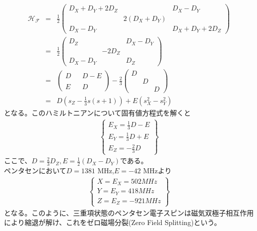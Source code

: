  \begin{eqnarray}
   \mathcal{H_F}&=&\frac{1}{2}
   \left( \begin{array}{rrr}
     D_X+D_Y+2D_Z&&D_X-D_Y\\
     &2(D_X+D_Y)&\\
     D_X-D_Y&&D_X+D_Y+2D_Z
   \end{array} \right)\\
   &=&\frac{1}{2}
   \left( \begin{array}{rrr}
     D_Z&&D_X-D_Y\\
     &-2D_Z&\\
     D_X-D_Y&&D_Z
   \end{array} \right)\\
   &=&
   \left( \begin{array}{rrr}
     D&&D-E\\
     &&\\
     E&&D
   \end{array} \right)
   -\frac{2}{3}
   \left( \begin{array}{rrr}
     D&&\\
     &D&\\
     &&D
   \end{array} \right)\\
   &=&
   D(s_Z-\frac{1}{3}s(s+1))+E(s_X^2-s_Y^2)
 \end{eqnarray}
 となる。このハミルトニアンについて固有値方程式を解くと
 \begin{eqnarray}
   \left\{
   \begin{array}{l}
   E_X=\frac{1}{3}D-E \\
   E_Y=\frac{1}{3}D+E \\
   E_Z=-\frac{2}{3}D
   \end{array}
   \right\}
   \end{eqnarray}
 ここで、$D=\frac{2}{3}D_Z,E=\frac{1}{2}(D_X-D_Y)$である。\\
 ペンタセンにおいて$D=1381$ MHz,$E=-42$ MHzより
 \begin{eqnarray}
   \left\{
   \begin{array}{l}
   X=E_X=502 MHz \\
   Y=E_Y=418 MHz \\
   Z=E_Z=-921MHz
   \end{array}
   \right\}
   \end{eqnarray}
 となる。このように、三重項状態のペンタセン電子スピンは磁気双極子相互作用により縮退が解け、これをゼロ磁場分裂(Zero Field Splitting)という。
 
